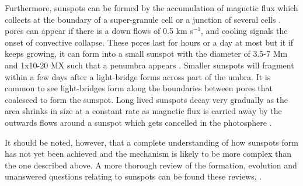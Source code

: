     Furthermore, sunspots can be formed by the accumulation of magnetic flux which collects at the boundary of a super-granule cell or a junction of several cells \cite{1974MNRAS.169...35M}.
    pores can appear if there is a down flows of 0.5 km s$^{-1}$, and cooling signals the onset of convective collapse.
    These pores last for hours or a day at most but it if keeps growing, it can form into a small sunspot with the diameter of 3.5-7 Mm and 1x10-20 MX such that a penumbra appears \citep{2010A&A...512L...1S}.
    Smaller sunspots will fragment within a few days after a light-bridge forms across part of the umbra.
    It is common to see light-bridges form along the boundaries between pores that coalesced to form the sunspot.
    Long lived sunspots decay very gradually as the area shrinks in size at a constant rate as magnetic flux is carried away by the outwards flows around a sunspot which gets cancelled in the photosphere \citep{2002AN....323..342M,2008ApJ...686.1447K}.
                          
    It should be noted, however, that a complete understanding of how sunspots form has not yet been achieved and the mechanism is likely to be more complex than the one described above.
    A more thorough review of the formation, evolution and unanswered questions relating to sunspots can be found these reviews, \cite{SAO,2008sust.book.....T,lrsp-2011-3}.

